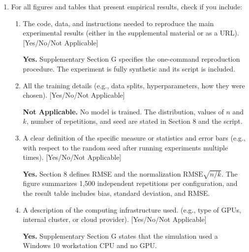 \begin{enumerate}[leftmargin=*]
\begin{enumerate}
  \textbf{Yes.} The main paper gives the proof spine and exact lower-bound calculation. The separately uploaded supplement proves the four concentration parameters, decoupling transfer, lower-bound likelihood projection, and path max-flow construction.

  \item Clear explanations of any assumptions. [Yes/No/Not Applicable]

  \textbf{Yes.} Sections 1, 3, 6, and 8 explain stationarity, the translated-set restriction, the lower-bound geometry, and the path cohort flag. Section 9 lists the remaining boundaries.
  \end{enumerate}

\item For all figures and tables that present empirical results, check if you include:
  \begin{enumerate}
  \item The code, data, and instructions needed to reproduce the main experimental results (either in the supplemental material or as a URL). [Yes/No/Not Applicable]

  \textbf{Yes.} Supplementary Section G specifies the one-command reproduction procedure. The experiment is fully synthetic and its script is included.

  \item All the training details (e.g., data splits, hyperparameters, how they were chosen). [Yes/No/Not Applicable]

  \textbf{Not Applicable.} No model is trained. The distribution, values of $n$ and $k$, number of repetitions, and seed are stated in Section 8 and the script.

  \item A clear definition of the specific measure or statistics and error bars (e.g., with respect to the random seed after running experiments multiple times). [Yes/No/Not Applicable]

  \textbf{Yes.} Section 8 defines RMSE and the normalization $\mathrm{RMSE}\sqrt{n/k}$. The figure summarizes 1,500 independent repetitions per configuration, and the result table includes bias, standard deviation, and RMSE.

  \item A description of the computing infrastructure used. (e.g., type of GPUs, internal cluster, or cloud provider). [Yes/No/Not Applicable]

  \textbf{Yes.} Supplementary Section G states that the simulation used a Windows 10 workstation CPU and no GPU.
  \end{enumerate}


\end{enumerate}
